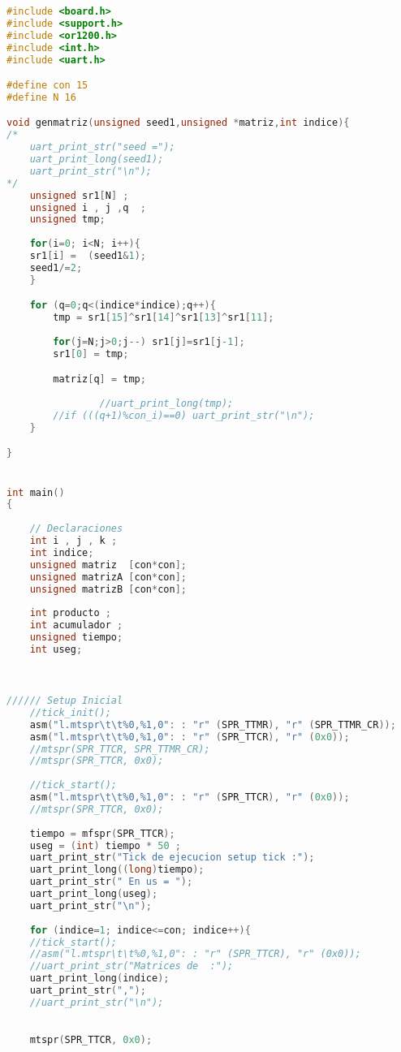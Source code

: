 \begin{lstlisting}[language=C,frame=single]
#include <board.h>
#include <support.h>
#include <or1200.h>
#include <int.h>
#include <uart.h>

#define con 15
#define N 16

void genmatriz(unsigned seed1,unsigned *matriz,int indice){
/*
    uart_print_str("seed ="); 
    uart_print_long(seed1);
    uart_print_str("\n");
*/    
    unsigned sr1[N] ;
    unsigned i , j ,q  ;
    unsigned tmp;    
    
    for(i=0; i<N; i++){
  	sr1[i] =  (seed1&1);
  	seed1/=2;
    }

    for (q=0;q<(indice*indice);q++){
		tmp = sr1[15]^sr1[14]^sr1[13]^sr1[11];
		
		for(j=N;j>0;j--) sr1[j]=sr1[j-1];
		sr1[0] = tmp;

		matriz[q] = tmp;
		
                //uart_print_long(tmp);
		//if (((q+1)%con_i)==0) uart_print_str("\n");
    }   

}


int main()
{
 
    // Declaraciones
    int i , j , k ; 
    int indice;
    unsigned matriz  [con*con];
    unsigned matrizA [con*con];
    unsigned matrizB [con*con];
    
    int producto ; 
    int acumulador ;
    unsigned tiempo;
    int useg;

	

////// Setup Inicial
    //tick_init();
    asm("l.mtspr\t\t%0,%1,0": : "r" (SPR_TTMR), "r" (SPR_TTMR_CR));
    asm("l.mtspr\t\t%0,%1,0": : "r" (SPR_TTCR), "r" (0x0));
    //mtspr(SPR_TTCR, SPR_TTMR_CR);
    //mtspr(SPR_TTCR, 0x0);
        
    //tick_start();
    asm("l.mtspr\t\t%0,%1,0": : "r" (SPR_TTCR), "r" (0x0));
    //mtspr(SPR_TTCR, 0x0);
    
    tiempo = mfspr(SPR_TTCR);
    useg = (int) tiempo * 50 ;
    uart_print_str("Tick de ejecucion setup tick :");
    uart_print_long((long)tiempo);
    uart_print_str(" En us = ");
    uart_print_long(useg);
    uart_print_str("\n");   
   
    for (indice=1; indice<=con; indice++){
    //tick_start();
    //asm("l.mtspr\t\t%0,%1,0": : "r" (SPR_TTCR), "r" (0x0));
    //uart_print_str("Matrices de  :");
    uart_print_long(indice);
    uart_print_str(",");
    //uart_print_str("\n");

 
    mtspr(SPR_TTCR, 0x0);
    

\end{lstlisting}
